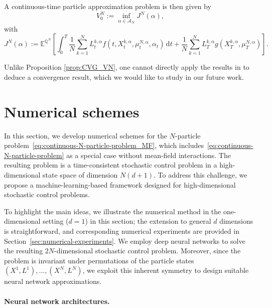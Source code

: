 \documentclass[11pt]{article}
\numberwithin{equation}{section}
\theoremstyle{plain}
\theoremstyle{definition}
\theoremstyle{remark}
\newcommand{\dd}{\mathrm{d}}
\begin{document}
	A continuous-time particle approximation problem is then given by 
	\begin{equation} \label{eq:continuous-N-particle-problem_MF}
		V_0^N :=\inf_{\alpha\in \mathcal{A}_N} J^N(\alpha), 
	\end{equation}
	with
	$$
	J^N(\alpha)
	:=
	\mathbb{E}^{\mathbb{Q}^N}\left[ \int_0^T \frac{1}{N}\sum_{k=1}^N L_t^{k,\alpha} f(t, X_t^{k,\alpha}, \mu_t^{N,\alpha},\alpha_t)\,\dd t + \frac{1}{N}\sum_{k=1}^N L_T^{k,\alpha} g(X_T^{k,\alpha}, \mu_T^{N,\alpha}) \right].
	$$
	
	Unlike Proposition \ref{prop:CVG_VN}, one cannot directly apply the results in \cite{bouchard2025limit} to deduce a convergence result, 
	which we would like to study in our future work.
	
	
	\section{Numerical schemes} \label{sec:numerical-schemes}
	
	In this section, we develop numerical schemes for the $N$-particle problem~\eqref{eq:continuous-N-particle-problem_MF}, which includes~\eqref{eq:continuous-N-particle-problem} as a special case without mean-field interactions. The resulting problem is a time-consistent stochastic control problem in a high-dimensional state space of dimension $N(d+1)$. To address this challenge, we propose a machine-learning-based framework designed for high-dimensional stochastic control problems. 
	
	To highlight the main ideas, we illustrate the numerical method in the one-dimensional setting ($d=1$) in this section; the extension to general $d$ dimensions is straightforward, and corresponding numerical experiments are provided in Section~\ref{sec:numerical-experiments}. We employ deep neural networks to solve the resulting $2N$-dimensional stochastic control problem. Moreover, since the problem is invariant under permutations of the particle states $(X^1, L^1), \dots, (X^N, L^N)$, we exploit this inherent symmetry to design suitable neural network approximations. 
	
	\paragraph{Neural network architectures.}
	
\end{document}
